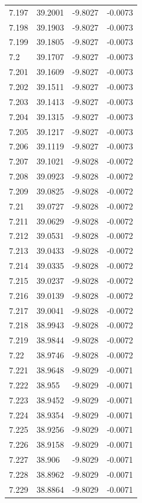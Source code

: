 \begin{tabular}{llll}
7.197 & 39.2001 & -9.8027 & -0.0073 \\
7.198 & 39.1903 & -9.8027 & -0.0073 \\
7.199 & 39.1805 & -9.8027 & -0.0073 \\
7.2 & 39.1707 & -9.8027 & -0.0073 \\
7.201 & 39.1609 & -9.8027 & -0.0073 \\
7.202 & 39.1511 & -9.8027 & -0.0073 \\
7.203 & 39.1413 & -9.8027 & -0.0073 \\
7.204 & 39.1315 & -9.8027 & -0.0073 \\
7.205 & 39.1217 & -9.8027 & -0.0073 \\
7.206 & 39.1119 & -9.8027 & -0.0073 \\
7.207 & 39.1021 & -9.8028 & -0.0072 \\
7.208 & 39.0923 & -9.8028 & -0.0072 \\
7.209 & 39.0825 & -9.8028 & -0.0072 \\
7.21 & 39.0727 & -9.8028 & -0.0072 \\
7.211 & 39.0629 & -9.8028 & -0.0072 \\
7.212 & 39.0531 & -9.8028 & -0.0072 \\
7.213 & 39.0433 & -9.8028 & -0.0072 \\
7.214 & 39.0335 & -9.8028 & -0.0072 \\
7.215 & 39.0237 & -9.8028 & -0.0072 \\
7.216 & 39.0139 & -9.8028 & -0.0072 \\
7.217 & 39.0041 & -9.8028 & -0.0072 \\
7.218 & 38.9943 & -9.8028 & -0.0072 \\
7.219 & 38.9844 & -9.8028 & -0.0072 \\
7.22 & 38.9746 & -9.8028 & -0.0072 \\
7.221 & 38.9648 & -9.8029 & -0.0071 \\
7.222 & 38.955 & -9.8029 & -0.0071 \\
7.223 & 38.9452 & -9.8029 & -0.0071 \\
7.224 & 38.9354 & -9.8029 & -0.0071 \\
7.225 & 38.9256 & -9.8029 & -0.0071 \\
7.226 & 38.9158 & -9.8029 & -0.0071 \\
7.227 & 38.906 & -9.8029 & -0.0071 \\
7.228 & 38.8962 & -9.8029 & -0.0071 \\
7.229 & 38.8864 & -9.8029 & -0.0071 \\

\end{tabular}
